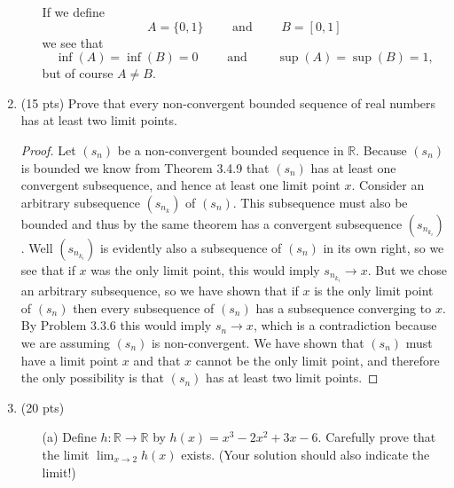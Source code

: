 \documentclass[12pt,twoside]{article}
\newcommand{\spand}{\qquad\text{ and }\qquad}
\newcommand{\R}{\mathbb R} %
\newenvironment{cexample}{\noindent {\em Counterexample:}}{\bigskip}
\begin{document}
\begin{enumerate}
\begin{itemize}
\begin{cexample} If we define $$A=\{0,1\} \spand B=[0,1]$$
we see that $$ \inf(A)=\inf(B)=0 \spand \sup(A)=\sup(B)=1,$$ but of course $A\ne B$.
\end{cexample}

\end{itemize}


\item (15 pts) Prove that every non-convergent bounded sequence of real numbers has at least two limit points.

\begin{proof} Let $(s_n)$ be a non-convergent bounded sequence in $\R$. Because $(s_n)$ is bounded we know from Theorem 3.4.9 that $(s_n)$ has at least one convergent subsequence, and hence at least one limit point $x$. Consider an arbitrary subsequence $(s_{n_k})$ of $(s_n)$. This subsequence must also be bounded and thus by the same theorem has a convergent subsequence $(s_{n_{k_i}})$. Well $(s_{n_{k_i}})$ is evidently also a subsequence of $(s_n)$ in its own right, so we see that if $x$ was the only limit point, this would imply $s_{n_{k_i}}\to x$. But we chose an arbitrary subsequence, so we have shown that if $x$ is the only limit point of $(s_n)$ then every subsequence of $(s_n)$ has a subsequence converging to $x$. By Problem 3.3.6 this would imply $s_n \to x$, which is a contradiction because we are assuming $(s_n)$ is non-convergent. We have shown that $(s_n)$ must have a limit point $x$ and that $x$ cannot be the only limit point, and therefore the only possibility is that $(s_n)$ has at least two limit points.
\end{proof}


\item (20 pts) \begin{itemize}
\item[(a)] Define $h:\R\to\R$ by $h(x)=x^3-2x^2+3x-6$. Carefully prove that the limit $\lim_{x\to 2}
h(x)$ exists.  (Your solution should also indicate the
limit!)


\end{itemize}
\end{enumerate}
\end{document}
